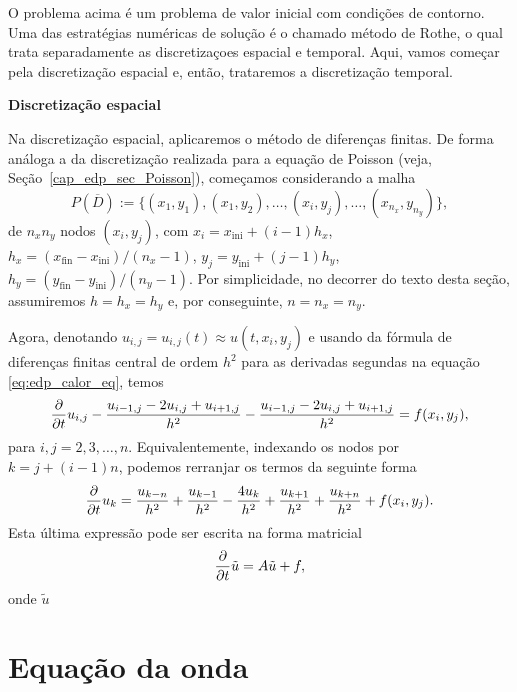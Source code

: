 O problema acima é um problema de valor inicial com condições de contorno. Uma das estratégias numéricas de solução é o chamado método de Rothe, o qual trata separadamente as discretizaçoes espacial e temporal. Aqui, vamos começar pela discretização espacial e, então, trataremos a discretização temporal.

\begin{flushleft}
  {\bf Discretização espacial}
\end{flushleft}

Na discretização espacial, aplicaremos o método de diferenças finitas. De forma análoga a da discretização realizada para a equação de Poisson (veja, Seção~\ref{cap_edp_sec_Poisson}), começamos considerando a malha
\begin{equation}
  P(\overline{D}) := \{(x_1, y_1), (x_1, y_2), \dotsc, (x_i, y_j), \dotsc, (x_{n_x}, y_{n_y})\},
\end{equation}
de $n_xn_y$ nodos $(x_i, y_j)$, com $x_i = x_{\text{ini}}+(i-1)h_x$, $h_x = (x_{\text{fin}}-x_{\text{ini}})/(n_x-1)$, $y_j = y_{\text{ini}}+(j-1)h_y$, $h_y = (y_{\text{fin}}-y_{\text{ini}})/(n_y-1)$. Por simplicidade, no decorrer do texto desta seção, assumiremos $h = h_x = h_y$ e, por conseguinte, $n=n_x=n_y$.

Agora, denotando $u_{i,j}=u_{i,j}(t)\approx u(t,x_i,y_j)$ e usando da fórmula de diferenças finitas central de ordem $h^2$ para as derivadas segundas na equação \eqref{eq:edp_calor_eq}, temos
\begin{equation}
  \frac{\partial}{\partial t}u_{i,j} - \frac{u_{i-1,j}-2u_{i,j}+u_{i+1,j}}{h^2} - \frac{u_{i-1,j}-2u_{i,j}+u_{i+1,j}}{h^2} = f(x_i,y_j),
\end{equation}
para $i,j=2, 3, \dotsc, n$. Equivalentemente, indexando os nodos por $k=j+(i-1)n$, podemos rerranjar os termos da seguinte forma
\begin{equation}
  \frac{\partial}{\partial t}u_k = \frac{u_{k-n}}{h^2}+\frac{u_{k-1}}{h^2}-\frac{4u_k}{h^2}+\frac{u_{k+1}}{h^2}+\frac{u_{k+n}}{h^2} + f(x_i,y_j).
\end{equation}
Esta última expressão pode ser escrita na forma matricial
\begin{equation}
  \frac{\partial}{\partial t}\tilde{u} = A\tilde{u} + f,
\end{equation}
onde $\tilde{u}$
\emconstrucao

\section{Equação da onda}\label{cap_edp_sec_onda}

\emconstrucao